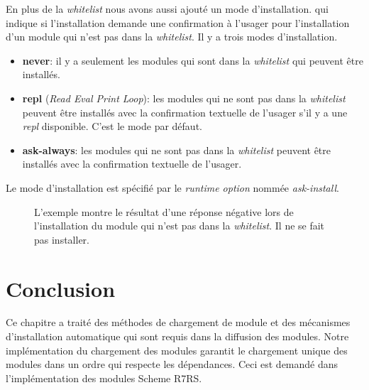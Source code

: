 En plus de la \textit{whitelist} nous avons aussi ajouté un mode
d'installation.  qui indique si l'installation demande une confirmation à
l'usager pour l'installation d'un module qui n'est pas dans la
\textit{whitelist}. Il y a trois modes d'installation.
\begin{itemize}
  \item \textbf{never}: il y a seulement les modules qui sont dans la
    \textit{whitelist} qui peuvent être installés.

  \item \textbf{repl} (\textit{Read Eval Print Loop}): les modules qui ne sont pas dans la \textit{whitelist}
    peuvent être installés avec la confirmation textuelle de l'usager s'il y a
    une \textit{repl} disponible. C'est le mode par défaut.

  \item \textbf{ask-always}: les modules qui ne sont pas dans la \textit{whitelist}
    peuvent être installés avec la confirmation textuelle de l'usager.
\end{itemize}

Le mode d'installation est spécifié par le \textit{runtime option} nommée
\textit{ask-install}.
\begin{figure}[h]
  \caption{L'exemple montre le résultat d'une réponse négative lors de
    l'installation du module qui n'est pas dans la \textit{whitelist}.
    Il ne se fait pas installer.}
\end{figure}


\section{Conclusion}

Ce chapitre a traité des méthodes de chargement de module et des mécanismes
d'installation automatique qui sont requis dans la diffusion des modules.
Notre implémentation du chargement des modules garantit le chargement unique
des modules dans un ordre qui respecte les dépendances. Ceci est demandé dans
l'implémentation des modules Scheme R7RS.

